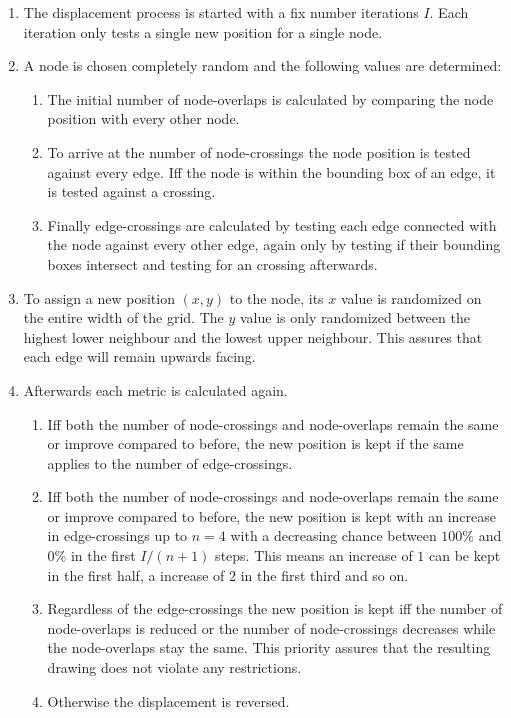 \documentclass[]{llncs}
\begin{document}
\medskip
\begin{enumerate}[start=0]
    \item The displacement process is started with a fix number iterations $I$. Each iteration only tests a single new position for a single node.
    \item A node is chosen completely random and the following values are determined:
    \begin{enumerate}
        \item The initial number of node-overlaps is calculated by comparing the node position with every other node.
        \item To arrive at the number of node-crossings the node position is tested against every edge. Iff the node is within the bounding box of an edge, it is tested against a crossing.
        \item Finally edge-crossings are calculated by testing each edge connected with the node against every other edge, again only by testing if their bounding boxes intersect and testing for an crossing afterwards.
    \end{enumerate}
    \item To assign a new position $(x,y)$ to the node, its $x$ value is randomized on the entire width of the grid. The $y$ value is only randomized between the highest lower neighbour and the lowest upper neighbour. This assures that each edge will remain upwards facing.
    \item Afterwards each metric is calculated again.
    \begin{enumerate}
        \item Iff both the number of node-crossings and node-overlaps remain the same or improve compared to before, the new position is kept if the same applies to the number of edge-crossings.
        \item Iff both the number of node-crossings and node-overlaps remain the same or improve compared to before, the new position is kept with an increase in edge-crossings up to $n = 4$ with a decreasing chance between $100\%$ and $0\%$ in the first $I / (n + 1)$ steps. This means an increase of $1$ can be kept in the first half, a increase of $2$ in the first third and so on. 
        \item Regardless of the edge-crossings the new position is kept iff the number of node-overlaps is reduced or the number of node-crossings decreases while the node-overlaps stay the same. This priority assures that the resulting drawing does not violate any restrictions.
        \item Otherwise the displacement is reversed.
    \end{enumerate}
\end{enumerate}
\end{document}

